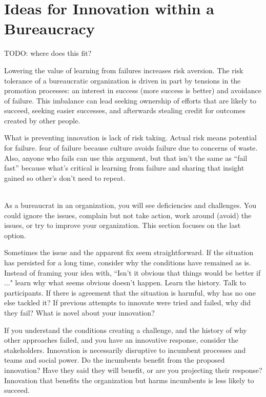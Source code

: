 \section{Ideas for Innovation within a Bureaucracy\label{sec:innovation}}

TODO: where does this fit?

Lowering the value of learning from failures increases risk aversion. The risk tolerance of a bureaucratic organization is driven in part by tensions in the promotion processes: an interest in success (more success is better) and avoidance of failure. This imbalance can lead seeking ownership of efforts that are likely to succeed, seeking easier successes, and afterwards stealing credit for outcomes created by other people. 

What is preventing innovation is lack of risk taking. Actual risk means potential for failure. fear of failure because culture avoids failure due to concerns of waste. Also, anyone who fails can use this argument, but that isn't the same as ``fail fast'' because what's critical is learning from failure and sharing that insight gained so other's don't need to repeat. 


\ \\

As a bureaucrat in an organization, you will see deficiencies and challenges. You could ignore the issues, complain but not take action, work around (avoid) the issues, or try to improve your organization. This section focuses on the last option.

Sometimes the issue and the apparent fix seem straightforward. If the situation has persisted for a long time, consider why the conditions have remained as is. 
Instead of framing your idea with, ``Isn't it obvious that things would be better if ..." learn why what seems obvious doesn't happen. 
Learn the history. Talk to participants. If there is agreement that the situation is harmful, why has no one else tackled it? If previous attempts to innovate were tried and failed, why did they fail? What is novel about your innovation?

If you understand the conditions creating a challenge, and the history of why other approaches failed, and you have an innovative response, consider the stakeholders. 
Innovation is necessarily disruptive to incumbent processes and teams and social power. 
Do the incumbents benefit from the proposed innovation? Have they said they will benefit, or are you projecting their response? 
Innovation that benefits the organization but harms incumbents is less likely to succeed. 

